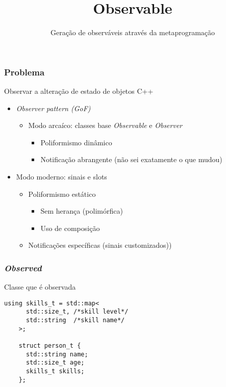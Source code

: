 \documentclass[t]{beamer}
\title{Observable}
\subtitle{Geração de observáveis através da metaprogramação}
\date{}
\begin{document}

\begin{frame}
  \titlepage
\end{frame}

\begin{frame}[fragile]
  \frametitle{Problema}
  Observar a alteração de estado de objetos C++

  \begin{itemize}
  \item<1->{\textit{Observer pattern (GoF)}}
    \begin{itemize}
    \item<2->{Modo arcaíco: classes base \textit{Observable} e \textit{Observer}}
      \begin{itemize}
      \item<3->{Poliformismo dinâmico} 
      \item<4->{Notificação abrangente (não sei exatamente o que mudou)} 
      \end{itemize}
    \end{itemize}
    \item<5->{Modo moderno: sinais e slots}
      \begin{itemize}
      \item<6->{Poliformismo estático} 
        \begin{itemize}
        \item<7->{Sem herança (polimórfica)} 
        \item<8->{Uso de composição} 
        \end{itemize}
      \item<9->{Notificações específicas (sinais customizados))} 
      \end{itemize}
  \end{itemize}
\end{frame}

\begin{frame}[fragile]
  \frametitle{\textit{Observed}}
  Classe que é observada

  \begin{lstlisting}[escapeinside=`']
    using skills_t = std::map<
      std::size_t, /*skill level*/
      std::string  /*skill name*/
    >;

    struct person_t {
      std::string name;
      std::size_t age;
      skills_t skills;
    };
  \end{lstlisting}
\end{frame}
\end{document}
